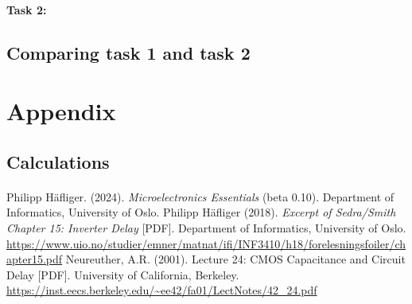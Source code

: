 \documentclass[onecolumn]{article}
\begin{document}
\paragraph{Task 2:} 

\paragraph{} 

\subsection{Comparing task 1 and task 2}

\section{Appendix}
\subsection{Calculations}
\paragraph{}

\begin{thebibliography}{9}
 Philipp Häfliger. (2024). \textit{Microelectronics Essentials} (beta 0.10). Department of Informatics, University of Oslo.
 Philipp Häfliger (2018). \textit{Excerpt of Sedra/Smith Chapter 15: Inverter Delay} [PDF].  Department of Informatics, University of Oslo. \url{https://www.uio.no/studier/emner/matnat/ifi/INF3410/h18/forelesningsfoiler/chapter15.pdf}
 Neureuther, A.R. (2001). Lecture 24: CMOS Capacitance and Circuit Delay [PDF]. University of California, Berkeley. \url{https://inst.eecs.berkeley.edu/~ee42/fa01/LectNotes/42_24.pdf}
\end{thebibliography}
\end{document}
